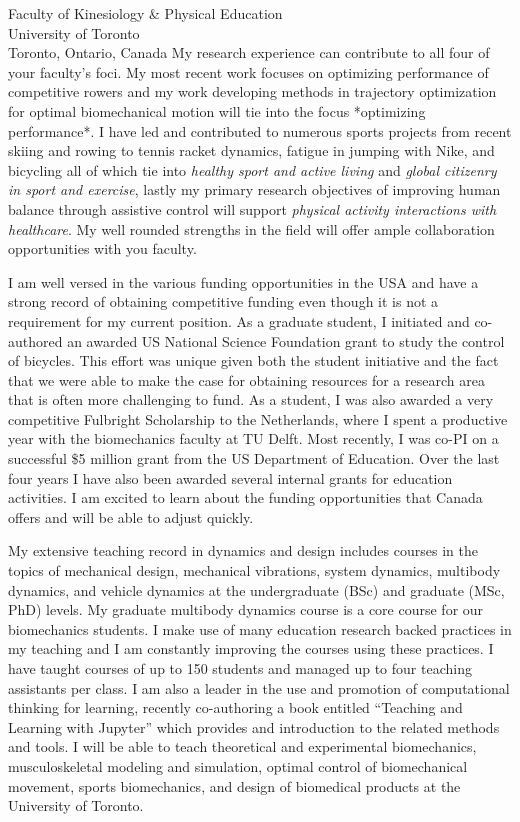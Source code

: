 \documentclass{letter}
\begin{document}
\begin{letter}{
  Faculty of Kinesiology \& Physical Education \\
  University of Toronto \\
  Toronto, Ontario, Canada
}
My research experience can contribute to all four of your faculty's foci. My
most recent work focuses on optimizing performance of competitive rowers and my
work developing methods in trajectory optimization for optimal biomechanical
motion will tie into the focus *optimizing performance*. I have led and
contributed to numerous sports projects from recent skiing and rowing to tennis
racket dynamics, fatigue in jumping with Nike, and bicycling all of which tie
into \emph{healthy sport and active living} and \emph{global citizenry in sport
and exercise}, lastly my primary research objectives of improving human balance
through assistive control will support \emph{physical activity interactions
with healthcare}. My well rounded strengths in the field will offer ample
collaboration opportunities with you faculty.

I am well versed in the various funding opportunities in the USA and have a
strong record of obtaining competitive funding even though it is not a
requirement for my current position. As a graduate student, I initiated and
co-authored an awarded US National Science Foundation grant to study the
control of bicycles. This effort was unique given both the student initiative
and the fact that we were able to make the case for obtaining resources for a
research area that is often more challenging to fund. As a student, I was also
awarded a very competitive Fulbright Scholarship to the Netherlands, where I
spent a productive year with the biomechanics faculty at TU Delft. Most
recently, I was co-PI on a successful \$5 million grant from the US Department
of Education. Over the last four years I have also been awarded several
internal grants for education activities. I am excited to learn about the
funding opportunities that Canada offers and will be able to adjust quickly.

My extensive teaching record in dynamics and design includes courses in the
topics of mechanical design, mechanical vibrations, system dynamics, multibody
dynamics, and vehicle dynamics at the undergraduate (BSc) and graduate (MSc,
PhD) levels. My graduate multibody dynamics course is a core course for our
biomechanics students. I make use of many education research backed practices
in my teaching and I am constantly improving the courses using these practices.
I have taught courses of up to 150 students and managed up to four teaching
assistants per class. I am also a leader in the use and promotion of
computational thinking for learning, recently co-authoring a book entitled
``Teaching and Learning with Jupyter'' which provides and introduction to the
related methods and tools. I will be able to teach theoretical and experimental
biomechanics, musculoskeletal modeling and simulation, optimal control of
biomechanical movement, sports biomechanics, and design of biomedical products
at the University of Toronto.


\end{letter}
\end{document}
